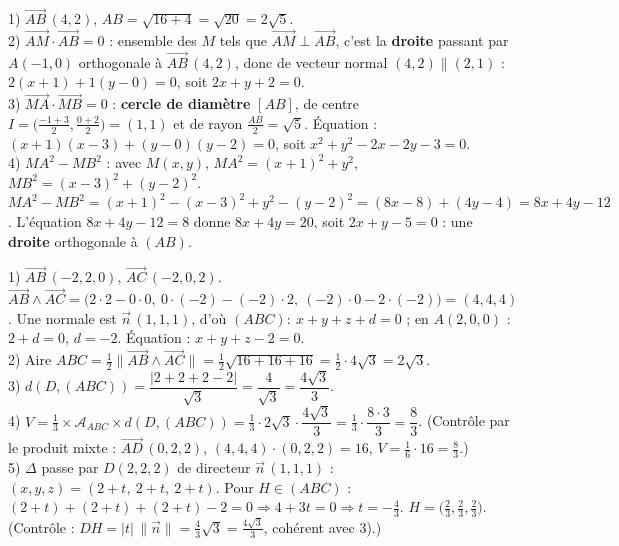 1) $\overrightarrow{AB}\,(4,2)$, $AB=\sqrt{16+4}=\sqrt{20}=2\sqrt5$.\\
2) $\overrightarrow{AM}\cdot\overrightarrow{AB}=0$ : ensemble des $M$ tels que
$\overrightarrow{AM}\perp\overrightarrow{AB}$, c'est la \textbf{droite} passant par $A(-1,0)$
orthogonale à $\overrightarrow{AB}\,(4,2)$, donc de vecteur normal $(4,2)\parallel(2,1)$ :
$2(x+1)+1(y-0)=0$, soit $2x+y+2=0$.\\
3) $\overrightarrow{MA}\cdot\overrightarrow{MB}=0$ : \textbf{cercle de diamètre} $[AB]$, de
centre $I=\big(\tfrac{-1+3}2,\tfrac{0+2}2\big)=(1,1)$ et de rayon $\tfrac{AB}2=\sqrt5$.
Équation : $(x+1)(x-3)+(y-0)(y-2)=0$, soit $x^{2}+y^{2}-2x-2y-3=0$.\\
4) $MA^{2}-MB^{2}$ : avec $M(x,y)$,
$MA^{2}=(x+1)^{2}+y^{2}$, $MB^{2}=(x-3)^{2}+(y-2)^{2}$.
$MA^{2}-MB^{2}=(x+1)^{2}-(x-3)^{2}+y^{2}-(y-2)^{2}=(8x-8)+(4y-4)=8x+4y-12$.
L'équation $8x+4y-12=8$ donne $8x+4y=20$, soit $2x+y-5=0$ : une \textbf{droite}
orthogonale à $(AB)$.

1) $\overrightarrow{AB}\,(-2,2,0)$, $\overrightarrow{AC}\,(-2,0,2)$.
$\overrightarrow{AB}\wedge\overrightarrow{AC}=\big(2\cdot2-0\cdot0,\ 0\cdot(-2)-(-2)\cdot2,\ (-2)\cdot0-2\cdot(-2)\big)=(4,4,4)$.
Une normale est $\vec n\,(1,1,1)$, d'où $(ABC):\ x+y+z+d=0$ ; en $A(2,0,0)$ : $2+d=0$, $d=-2$.
Équation : $x+y+z-2=0$.\\
2) Aire $ABC=\tfrac12\|\overrightarrow{AB}\wedge\overrightarrow{AC}\|=\tfrac12\sqrt{16+16+16}=\tfrac12\cdot4\sqrt3=2\sqrt3$.\\
3) $d(D,(ABC))=\dfrac{|2+2+2-2|}{\sqrt3}=\dfrac{4}{\sqrt3}=\dfrac{4\sqrt3}{3}$.\\
4) $V=\tfrac13\times\mathcal A_{ABC}\times d(D,(ABC))=\tfrac13\cdot 2\sqrt3\cdot\dfrac{4\sqrt3}{3}=\tfrac13\cdot\dfrac{8\cdot3}{3}=\dfrac{8}{3}$.
(Contrôle par le produit mixte : $\overrightarrow{AD}\,(0,2,2)$,
$(4,4,4)\cdot(0,2,2)=16$, $V=\tfrac16\cdot16=\tfrac83$.)\\
5) $\Delta$ passe par $D(2,2,2)$ de directeur $\vec n\,(1,1,1)$ : $(x,y,z)=(2+t,\ 2+t,\ 2+t)$.
Pour $H\in(ABC)$ : $(2+t)+(2+t)+(2+t)-2=0\Rightarrow 4+3t=0\Rightarrow t=-\tfrac43$.
$H=\big(\tfrac23,\tfrac23,\tfrac23\big)$.
(Contrôle : $DH=|t|\,\|\vec n\|=\tfrac43\sqrt3=\tfrac{4\sqrt3}{3}$, cohérent avec 3).)


